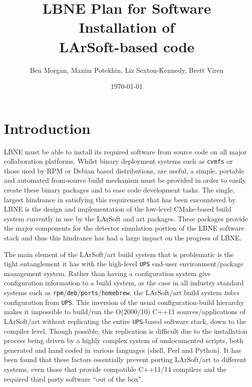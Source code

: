 \documentclass[usletter]{article}
\newcommand{\code}[1]{\texttt{#1}}
\newcommand{\ups}{\code{UPS}\xspace}
\newcommand{\art}{art\xspace}
\newcommand{\larsoft}{LArSoft\xspace}
\begin{document}
\title{LBNE Plan for Software Installation of\\
  LArSoft-based code}
\author{Ben Morgan, Maxim Potekhin, Liz Sexton-Kennedy, Brett Viren}
\date{\today}
\maketitle
\tableofcontents

\section{Introduction}
LBNE must be able to install its required software from source code on
all major collaboration platforms\cite{docdb8035}.  Whilst binary
deployment systems such as \code{cvmfs} or those used by RPM or Debian
based distributions, are useful, a simple, portable and automated
from-source build mechanism must be provided in order to easily create
these binary packages and to ease code development tasks. The single,
largest hindrance in satisfying this requirement that has been
encountered by LBNE is the design and implementation of the low-level
CMake-based build system currently in use by the \larsoft and \art
packages.  These packages provide the major components for the
detector simulation portion of the LBNE software stack and thus this
hindrance has had a large impact on the progress of LBNE.

The main element of the \larsoft/\art build system that is problematic
is the tight entanglement it has with the high-level \ups end-user
environment/package management system. Rather than having a configuration system
give configuration information to a build system, as the case in all industry
standard systems such as \code{rpm}/\code{deb}/\code{ports}/\code{homebrew}, the \larsoft/\art
build system \textit{takes} configuration from \ups. This inversion of the usual
configuration-build hierarchy makes it impossible to build/run
the O(2000/10) C++11 sources/applications of \larsoft/\art
without replicating the entire \ups-based software stack, down to the compiler
level. Though possible, this replication is difficult due to the installation
process being driven by a highly complex system of undocumented scripts, both
generated and hand coded in various languages (shell, Perl and Python).
It has been found that these factors essentially prevent porting \larsoft/\art
to different systems, even those that provide compatible C++11/14 compilers
and the required third party software ``out of the box".
\end{document}
